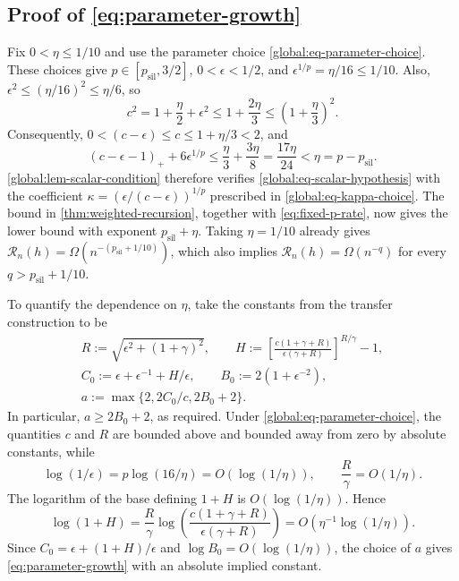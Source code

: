 \documentclass[11pt,letterpaper]{article}
\theoremstyle{definition}
\newcommand{\psil}{p_{\mathrm{sil}}}
\begin{document}
\subsection[Proof of (\ref{eq:parameter-growth})]{Proof of \eqref{eq:parameter-growth}}
\label{global:app-parameters}
\label{global:app-nonanytime}

Fix \(0<\eta\le1/10\) and use the parameter choice \eqref{global:eq-parameter-choice}.
These choices give \(p\in[\psil,3/2]\), \(0<\epsilon<1/2\), and \(\epsilon^{1/p}=\eta/16\le1/10\).
Also, \(\epsilon^2\le(\eta/16)^2\le\eta/6\), so
\[
 c^2=1+\frac{\eta}{2}+\epsilon^2 \le1+\frac{2\eta}{3} \le\left(1+\frac{\eta}{3}\right)^2.
\]
Consequently, \(0<(c-\epsilon)\le c\le1+\eta/3<2\), and
\[
 (c-\epsilon-1)_++6\epsilon^{1/p} \le\frac{\eta}{3}+\frac{3\eta}{8} =\frac{17\eta}{24}<\eta=p-\psil.
\]
\cref{global:lem-scalar-condition} therefore verifies \eqref{global:eq-scalar-hypothesis} with the coefficient \(\kappa=(\epsilon/(c-\epsilon))^{1/p}\) prescribed in \eqref{global:eq-kappa-choice}.
The bound in \cref{thm:weighted-recursion}, together with \eqref{eq:fixed-p-rate}, now gives the lower bound with exponent \(\psil+\eta\).
Taking \(\eta=1/10\) already gives \(\mathcal R_n(h)=\Omega(n^{-(p_{\mathrm{sil}}+1/10)})\), which also implies \(\mathcal R_n(h)=\Omega(n^{-q})\) for every \(q>p_{\mathrm{sil}}+1/10\).

To quantify the dependence on \(\eta\), take the constants from the transfer construction to be
\begin{equation*}
 \begin{gathered}
 R:=\sqrt{\epsilon^2+(1+\gamma)^2},\qquad H:=\left[\frac{c(1+\gamma+R)}{\epsilon(\gamma+R)}\right]^{R/\gamma}-1,\\
 C_0:=\epsilon+\epsilon^{-1}+H/\epsilon,\qquad B_0:=2(1+\epsilon^{-2}),\\
 a:=\max\{2,2C_0/c,2B_0+2\}.
 \end{gathered}
\end{equation*}
In particular, \(a\ge2B_0+2\), as required.
Under \eqref{global:eq-parameter-choice}, the quantities \(c\) and \(R\) are bounded above and bounded away from zero by absolute constants, while
\[
 \log(1/\epsilon)=p\log(16/\eta)=O(\log(1/\eta)), \qquad \frac{R}{\gamma}=O(1/\eta).
\]
The logarithm of the base defining \(1+H\) is \(O(\log(1/\eta))\).
Hence
\[
 \log(1+H) =\frac{R}{\gamma} \log\!\left(\frac{c(1+\gamma+R)}{\epsilon(\gamma+R)}\right) =O\!\left(\eta^{-1}\log(1/\eta)\right).
\]
Since \(C_0=\epsilon+(1+H)/\epsilon\) and \(\log B_0=O(\log(1/\eta))\), the choice of \(a\) gives \eqref{eq:parameter-growth} with an absolute implied constant. 
\end{document}
